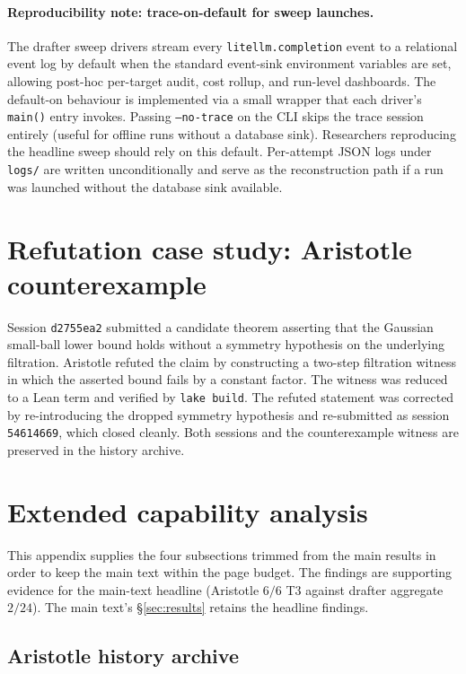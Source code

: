 \paragraph{Reproducibility note: trace-on-default for sweep launches.}
The drafter sweep drivers stream every \texttt{litellm.completion}
event to a relational event log by default when the standard
event-sink environment variables are set, allowing post-hoc
per-target audit, cost rollup, and run-level dashboards. The
default-on behaviour is implemented via a small wrapper that each
driver's \texttt{main()} entry invokes. Passing \texttt{--no-trace}
on the CLI skips the trace session entirely (useful for offline
runs without a database sink). Researchers reproducing the headline
sweep should rely on this default. Per-attempt JSON logs under
\texttt{logs/} are written unconditionally and serve as the
reconstruction path if a run was launched without the database
sink available.

\section{Refutation case study: Aristotle counterexample}
\label{app:refutation-case}

Session \texttt{d2755ea2} submitted a candidate theorem asserting that
the Gaussian small-ball lower bound holds without a symmetry
hypothesis on the underlying filtration. Aristotle refuted the claim
by constructing a two-step filtration witness in which the asserted
bound fails by a constant factor. The witness was reduced to a
Lean term and verified by \texttt{lake build}. The refuted statement
was corrected by re-introducing the dropped symmetry hypothesis and
re-submitted as session \texttt{54614669}, which closed cleanly. Both
sessions and the counterexample witness are preserved in the
history archive.

\section{Extended capability analysis}
\label{app:extended}

This appendix supplies the four subsections trimmed from the main
results in order to keep the main text within the page
budget. The findings are supporting evidence for the main-text
headline (Aristotle $6/6$ T3 against drafter aggregate $2/24$). The
main text's §\ref{sec:results} retains the headline findings.

\subsection{Aristotle history archive}
\label{app:aristotle-history}

